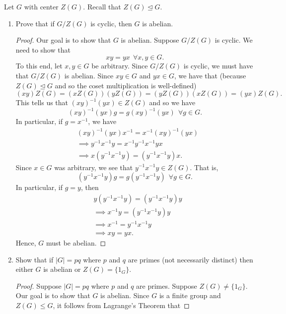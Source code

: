 \documentclass{article}
\begin{document}
\begin{problem}
    Let \( G  \) with center \( Z(G) \). Recall that \( Z(G) \trianglelefteq G  \).
    \begin{enumerate}
        \item[(a)] Prove that if \( G / Z(G) \) is cyclic, then \( G  \) is abelian.
            \begin{proof}
          Our goal is to show that \( G  \) is abelian. Suppose \( G / Z(G) \) is cyclic. We need to show that 
          \[  xy = yx \ \ \forall x,y \in G. \]
          To this end, let \( x,y \in G  \) be arbitrary. Since \( G / Z(G) \) is cyclic, we must have that \( G / Z(G) \) is abelian. Since \( xy \in G  \) and \( yx \in G  \), we have that (because \( Z(G) \trianglelefteq G  \) and so the coset multiplication is well-defined) 
          \[  (xy) Z(G) = (x Z(G) )(y Z(G)) = (y Z(G))(x Z(G)) = (yx) Z(G).  \]
          This tells us that \( (xy)^{-1}(yx) \in Z(G) \) and so we have 
          \[ (xy)^{-1}(yx)g = g (xy)^{-1}(yx) \ \ \forall g \in G.  \]
          In particular, if \( g = x^{-1} \), we have 
          \begin{align*}
              &(xy)^{-1}(yx) x^{-1} = x^{-1}(xy)^{-1} (yx) \\
              &\implies y^{-1}x^{-1} y = x^{-1}y^{-1} x^{-1}yx \\    
              &\implies x(y^{-1} x^{-1} y) = (y^{-1}x^{-1}y)x.
          \end{align*}
          Since \( x \in G  \) was arbitrary, we see that \( y^{-1}x^{-1} y \in Z(G) \). That is,
          \[  (y^{-1}x^{-1}y)g = g(y^{-1}x^{-1}y) \ \ \forall g \in G. \]
          In particular, if \( g = y  \), then
          \begin{align*}
              &y(y^{-1}x^{-1}y) = (y^{-1}x^{-1}y)y \\
              &\implies x^{-1}y = (y^{-1}x^{-1}y) y \\
              &\implies x^{-1} = y^{-1}x^{-1}y \\
              &\implies xy = yx.
          \end{align*}
          Hence, \( G  \) must be abelian.
            \end{proof}
        \item[(b)] Show that if \( | G  |  = pq  \) where \( p  \) and \( q  \) are primes (not necessarily distinct) then either \( G  \) is abelian or \( Z(G) = \{  {1}_{G} \}  \).
            \begin{proof}
            Suppose \( | G  |  = pq  \) where \( p  \) and \( q  \) are primes. Suppose \( Z(G) \neq \{ {1}_{G} \}  \). Our goal is to show that \( G  \) is abelian. Since \( G  \) is a finite group and \( Z(G) \leq G  \), it follows from Lagrange's Theorem that  

\end{proof}
\end{enumerate}
\end{problem}
\end{document}
